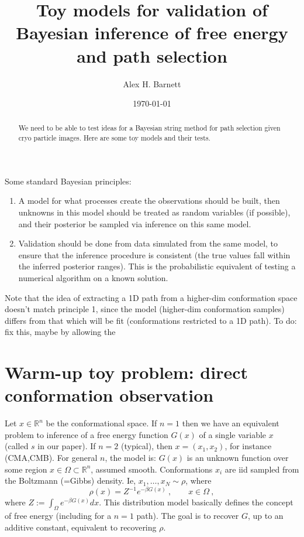 \documentclass[10pt]{article}
\newcommand{\ben}{\begin{enumerate}}
\newcommand{\een}{\end{enumerate}}
\newcommand{\be}{\begin{equation}}
\newcommand{\ee}{\end{equation}}
\newcommand{\R}{\mathbb{R}}
\newcommand{\bt}{\beta}
\begin{document}
\title{Toy models for validation of Bayesian inference of free energy and path selection}

\author{Alex H. Barnett}
\date{\today}
\maketitle

\begin{abstract}
  We need to be able to test ideas for a Bayesian string method for path selection given cryo particle images.
  Here are some toy models and their tests.
\end{abstract}

Some standard Bayesian principles:
\ben
\item
A model for what processes create the observations
should be built, then unknowns in this model should be treated as
random variables (if possible), and their posterior be sampled
via inference on this same model.
\item
Validation should be done from data simulated from the same model,
to ensure that the inference procedure is consistent (the true values
fall within the inferred posterior ranges). This is the
probabilistic
equivalent of testing a numerical algorithm on a known solution.
\een

Note that the idea of extracting a 1D path from a higher-dim conformation
space
doesn't match principle 1, since the model (higher-dim conformation samples)
differs from that which will be fit (conformations restricted to a 1D path).
To do: fix this, maybe by allowing the 


\section{Warm-up toy problem: direct conformation observation}

Let $x\in\R^n$ be the conformational space.
If $n=1$ then we have an equivalent problem to inference of a
free energy function $G(x)$ of a single variable $x$ (called $s$ in our
paper).
If $n=2$ (typical), then $x = (x_1,x_2)$, for instance (CMA,CMB).
For general $n$, the model is: $G(x)$ is an unknown function over
some region $x\in\Omega \subset \R^n$, assumed smooth.
Conformations $x_i$ are iid sampled from the
Boltzmann (=Gibbs) density. Ie, $x_1,\dots, x_N \sim \rho$, where
\be
\rho(x) = Z^{-1} e^{-\bt G(x)}~, \qquad x\in\Omega~,
\label{boltz}
\ee
where $Z := \int_\Omega e^{-\bt G(x)} dx$.
This distribution model basically defines the concept of free energy
(including for a $n=1$ path).
The goal is to recover $G$, up to an additive constant,
equivalent to recovering $\rho$.
\end{document}
